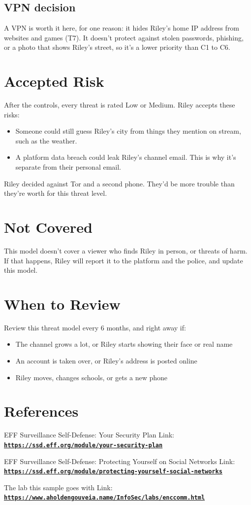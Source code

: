 \documentclass[11pt]{article}
\begin{document}
\subsection*{VPN decision}
A VPN is worth it here, for one reason: it hides Riley's home IP address from websites and games (T7). It doesn't protect against stolen passwords, phishing, or a photo that shows Riley's street, so it's a lower priority than C1 to C6.

\section{Accepted Risk}
After the controls, every threat is rated Low or Medium. Riley accepts these risks:
\begin{itemize}
    \item Someone could still guess Riley's city from things they mention on stream, such as the weather.
    \item A platform data breach could leak Riley's channel email. This is why it's separate from their personal email.
\end{itemize}
Riley decided against Tor and a second phone. They'd be more trouble than they're worth for this threat level.

\section{Not Covered}
This model doesn't cover a viewer who finds Riley in person, or threats of harm. If that happens, Riley will report it to the platform and the police, and update this model.

\section{When to Review}
Review this threat model every 6 months, and right away if:
\begin{itemize}
    \item The channel grows a lot, or Riley starts showing their face or real name
    \item An account is taken over, or Riley's address is posted online
    \item Riley moves, changes schools, or gets a new phone
\end{itemize}

\section{References}
EFF Surveillance Self-Defense: Your Security Plan
Link: \href{https://ssd.eff.org/module/your-security-plan}{\textbf{\nolinkurl{https://ssd.eff.org/module/your-security-plan}}}

EFF Surveillance Self-Defense: Protecting Yourself on Social Networks
Link: \href{https://ssd.eff.org/module/protecting-yourself-social-networks}{\textbf{\nolinkurl{https://ssd.eff.org/module/protecting-yourself-social-networks}}}

The lab this sample goes with
Link: \href{https://www.aholdengouveia.name/InfoSec/labs/enccomm.html}{\textbf{\nolinkurl{https://www.aholdengouveia.name/InfoSec/labs/enccomm.html}}}
\end{document}
